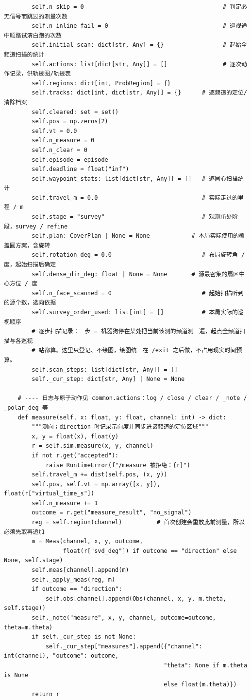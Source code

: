 \documentclass[UTF8, zihao=5,AutoFakeBold=2]{ctexart}
\begin{document}
\begin{lstlisting}
        self.n_skip = 0                                        # 判定必无信号而跳过的测量次数
        self.n_inline_fail = 0                                 # 巡视途中顺路试清白跑的次数
        self.initial_scan: dict[str, Any] = {}                 # 起始全频道扫描的统计
        self.actions: list[dict[str, Any]] = []                # 逐次动作记录，供轨迹图/轨迹表
        self.regions: dict[int, ProbRegion] = {}
        self.tracks: dict[int, dict[str, Any]] = {}      # 逐频道的定位/清除档案
        self.cleared: set = set()
        self.pos = np.zeros(2)
        self.vt = 0.0
        self.n_measure = 0
        self.n_clear = 0
        self.episode = episode
        self.deadline = float("inf")
        self.waypoint_stats: list[dict[str, Any]] = []   # 逐圆心扫描统计
        self.travel_m = 0.0                              # 实际走过的里程 / m
        self.stage = "survey"                            # 观测所处阶段，survey / refine
        self.plan: CoverPlan | None = None            # 本局实际使用的覆盖圆方案，含旋转
        self.rotation_deg = 0.0                          # 布局旋转角 / 度，起始扫描后确定
        self.dense_dir_deg: float | None = None       # 源最密集的扇区中心方位 / 度
        self.n_face_scanned = 0                          # 起始扫描听到的源个数，选向依据
        self.survey_order_used: list[int] = []           # 本局实际的巡视顺序
        # 逐步扫描记录：一步 = 机器狗停在某处把当前该测的频道测一遍，起点全频道扫描与各巡视
        # 站都算。这里只登记、不绘图，绘图统一在 /exit 之后做，不占用现实时间预算。
        self.scan_steps: list[dict[str, Any]] = []
        self._cur_step: dict[str, Any] | None = None

    # ---- 日志与原子动作见 common.actions：log / close / clear / _note / _polar_deg 等 ----
    def measure(self, x: float, y: float, channel: int) -> dict:
        """测向；direction 时记录示向度并同步进该频道的定位区域"""
        x, y = float(x), float(y)
        r = self.sim.measure(x, y, channel)
        if not r.get("accepted"):
            raise RuntimeError(f"/measure 被拒绝：{r}")
        self.travel_m += dist(self.pos, (x, y))
        self.pos, self.vt = np.array([x, y]), float(r["virtual_time_s"])
        self.n_measure += 1
        outcome = r.get("measure_result", "no_signal")
        reg = self.region(channel)          # 首次创建会重放此前测量，所以必须先取再追加
        m = Meas(channel, x, y, outcome,
                 float(r["svd_deg"]) if outcome == "direction" else None, self.stage)
        self.meas[channel].append(m)
        self._apply_meas(reg, m)
        if outcome == "direction":
            self.obs[channel].append(Obs(channel, x, y, m.theta, self.stage))
        self._note("measure", x, y, channel, outcome=outcome, theta=m.theta)
        if self._cur_step is not None:
            self._cur_step["measures"].append({"channel": int(channel), "outcome": outcome,
                                              "theta": None if m.theta is None
                                              else float(m.theta)})
        return r


\end{lstlisting}
\end{document}
